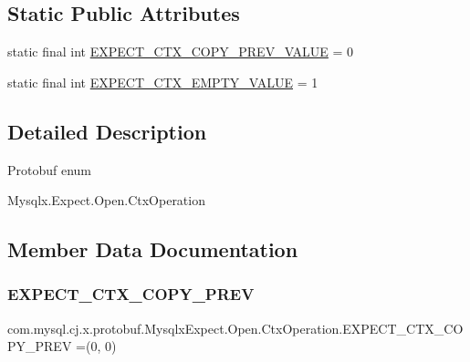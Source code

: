 \subsection*{Static Public Attributes}
\begin{DoxyCompactItemize}
\item 
static final int \mbox{\hyperlink{enumcom_1_1mysql_1_1cj_1_1x_1_1protobuf_1_1_mysqlx_expect_1_1_open_1_1_ctx_operation_aa7cf9cbb9f88e4aabf9f898ceb715b90}{E\+X\+P\+E\+C\+T\+\_\+\+C\+T\+X\+\_\+\+C\+O\+P\+Y\+\_\+\+P\+R\+E\+V\+\_\+\+V\+A\+L\+UE}} = 0
\item 
static final int \mbox{\hyperlink{enumcom_1_1mysql_1_1cj_1_1x_1_1protobuf_1_1_mysqlx_expect_1_1_open_1_1_ctx_operation_a336d6c61b13fcb430b9af0ce586aa6d1}{E\+X\+P\+E\+C\+T\+\_\+\+C\+T\+X\+\_\+\+E\+M\+P\+T\+Y\+\_\+\+V\+A\+L\+UE}} = 1
\end{DoxyCompactItemize}


\subsection{Detailed Description}
Protobuf enum
\begin{DoxyCode}
Mysqlx.Expect.Open.CtxOperation 
\end{DoxyCode}
 

\subsection{Member Data Documentation}
\mbox{\label{enumcom_1_1mysql_1_1cj_1_1x_1_1protobuf_1_1_mysqlx_expect_1_1_open_1_1_ctx_operation_a7f58b438fc85b51f5026af47b95a9530}} 
\subsubsection{\texorpdfstring{E\+X\+P\+E\+C\+T\+\_\+\+C\+T\+X\+\_\+\+C\+O\+P\+Y\+\_\+\+P\+R\+EV}{EXPECT\_CTX\_COPY\_PREV}}
{\footnotesize\ttfamily com.\+mysql.\+cj.\+x.\+protobuf.\+Mysqlx\+Expect.\+Open.\+Ctx\+Operation.\+E\+X\+P\+E\+C\+T\+\_\+\+C\+T\+X\+\_\+\+C\+O\+P\+Y\+\_\+\+P\+R\+EV =(0, 0)}

